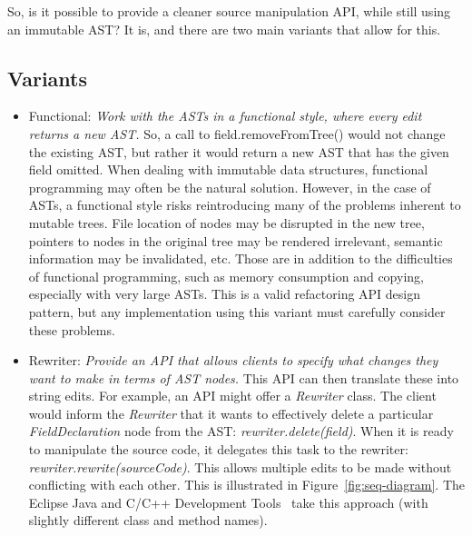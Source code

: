 \documentclass[prodmode]{acmlarge}
\begin{document}
So, is it possible to provide a cleaner source manipulation API, while still
using an immutable AST?  It is, and there are two main variants that allow
for this.

\subsection{Variants}

\begin{itemize}

    \item Functional: \textit{Work with the ASTs in a functional style, where every edit
        returns a new AST.} So, a call to field.removeFromTree() would not
        change the existing AST, but rather it would return a new AST that has
        the given field omitted. When dealing with immutable data structures,
        functional programming may often be the natural solution. However,
        in the case of ASTs, a functional style risks reintroducing many of 
        the problems inherent to mutable trees. File location of nodes may
        be disrupted in the new tree, pointers to nodes in the original tree may
        be rendered 
        irrelevant, semantic information may be invalidated, etc. Those are in
        addition to the difficulties of functional programming, such as memory
        consumption and copying, especially with very large ASTs. This is
        a valid refactoring API design pattern, but any implementation using 
        this variant must carefully consider these problems.

    \item Rewriter: \textit{Provide an API that allows clients to specify what changes
        they want to make in terms of AST nodes.}  This API can then translate these into string edits.  For example, an API might offer a \textit{Rewriter} 
class. The client would inform the \textit{Rewriter} that it wants to 
effectively delete a particular \textit{FieldDeclaration} node from the AST:
\textit{rewriter.delete(field)}.  When it is ready to manipulate the source
code, it delegates this task to the rewriter:
\textit{rewriter.rewrite(sourceCode)}.  This allows multiple edits to be made 
without conflicting with each other. This is illustrated in
Figure~\ref{fig:seq-diagram}.  The Eclipse Java and C/C++ Development
Tools~\cite{cdt-refactoring} take this approach (with slightly different class
and method names).


\end{itemize}
\end{document}

